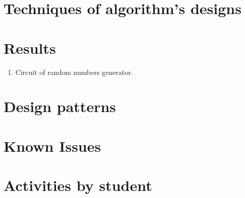 \documentclass[twocolumn]{IEEEtran}
\begin{document}
\section{Techniques of algorithm's designs}




\section{Results}

\begin{enumerate}
	\item Circuit of random numbers generator. 

\end{enumerate}






\section{Design patterns}

\section{Known Issues}

\section{Activities by student}
\end{document}
